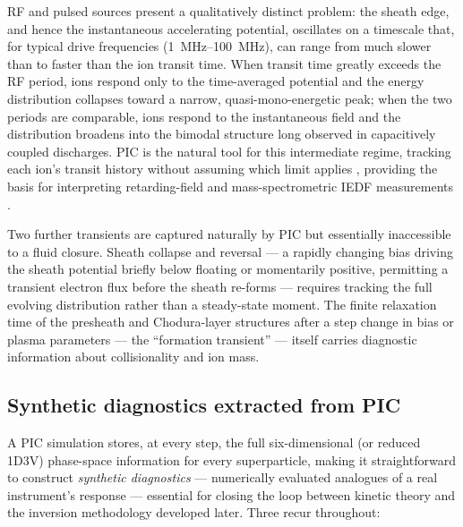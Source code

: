 RF and pulsed sources present a qualitatively distinct problem: the sheath edge, and hence the instantaneous accelerating potential, oscillates on a timescale that, for typical drive frequencies (\SIrange{1}{100}{\mega\hertz}), can range from much slower than to faster than the ion transit time. When transit time greatly exceeds the RF period, ions respond only to the time-averaged potential and the energy distribution collapses toward a narrow, quasi-mono-energetic peak; when the two periods are comparable, ions respond to the instantaneous field and the distribution broadens into the bimodal structure long observed in capacitively coupled discharges. PIC is the natural tool for this intermediate regime, tracking each ion's transit history without assuming which limit applies \cite{ref0637}, providing the basis for interpreting retarding-field and mass-spectrometric IEDF measurements \cite{ref0672}.

Two further transients are captured naturally by PIC but essentially inaccessible to a fluid closure. Sheath collapse and reversal --- a rapidly changing bias driving the sheath potential briefly below floating or momentarily positive, permitting a transient electron flux before the sheath re-forms --- requires tracking the full evolving distribution rather than a steady-state moment. The finite relaxation time of the presheath and Chodura-layer structures after a step change in bias or plasma parameters --- the ``formation transient'' --- itself carries diagnostic information about collisionality and ion mass.

\subsection{Synthetic diagnostics extracted from PIC}

A PIC simulation stores, at every step, the full six-dimensional (or reduced 1D3V) phase-space information for every superparticle, making it straightforward to construct \emph{synthetic diagnostics} --- numerically evaluated analogues of a real instrument's response --- essential for closing the loop between kinetic theory and the inversion methodology developed later. Three recur throughout:

